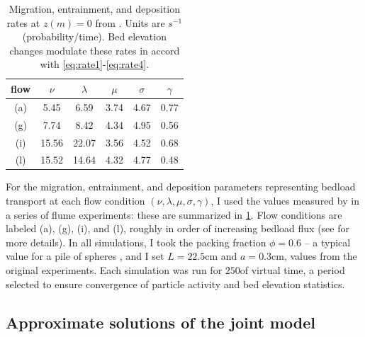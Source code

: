 \begin{table}
	\caption{Migration, entrainment, and deposition rates at $z(m)=0$ from \citet{Ancey2008}. Units are $s^{-1}$ (probability/time). Bed elevation changes modulate these rates in accord with \DIFdelbegin \DIFdel{(}\DIFdelend \DIFaddbegin {}\DIFaddend \ref{eq:rate1}-\ref{eq:rate4}\DIFdelbegin \DIFdel{)}\DIFdelend .}\label{tab:anceyparams}
	\begin{tabular}{cccccc} \\ 
		\toprule  
		flow & $\nu$ & $\lambda$ & $\mu$ & $\sigma$ & $\gamma$ \\
		\midrule
		(a) & 5.45  & 6.59  & 3.74 & 4.67 & 0.77 \\
		\midrule
		(g) & 7.74  & 8.42  & 4.34 & 4.95 & 0.56 \\
		\midrule
		(i) & 15.56 & 22.07 & 3.56 & 4.52 & 0.68 \\
		\midrule
		(l) & 15.52 & 14.64 & 4.32 & 4.77 & 0.48 \\
		\bottomrule
	\end{tabular}
\end{table}
For the migration, entrainment, and deposition parameters representing bedload transport at each flow condition $(\nu, \lambda, \mu, \sigma, \gamma)$, I used the values measured by \citet{Ancey2008} in a series of flume experiments: these are summarized in \DIFdelbegin {}\DIFdelend \DIFaddbegin {}\DIFaddend \ref{tab:anceyparams}.
Flow conditions are labeled (a), (g), (i), and (l), roughly in order of increasing bedload flux (see \citet{Ancey2008} for more details). 
In all simulations, I took the packing fraction $\phi = 0.6$ -- a typical value for a pile of spheres \DIFdelbegin {}\DIFdelend \DIFaddbegin {}\DIFaddend , and I set $L = 22.5$cm and $a = 0.3$cm, values from the original \citet{Ancey2008} experiments.
Each simulation was run for $250$\DIFdelbegin {}\DIFdelend \DIFaddbegin {}\DIFaddend of virtual time, a period selected to ensure convergence of particle activity and bed elevation statistics.

\subsection{Approximate solutions of the joint model}
\label{sec:eleanalytical}

